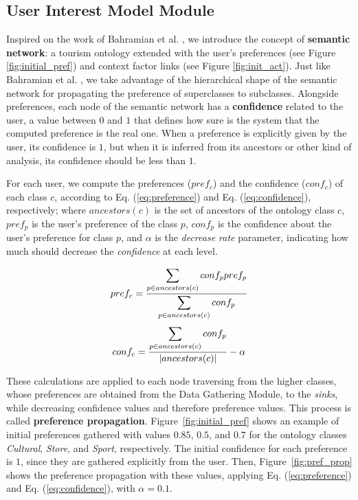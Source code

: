 \vspace{-0.2cm}
\subsection{User Interest Model Module}
Inspired on the work of Bahramian et al. \cite{bahramian_abbaspour_claramunt_2017}, we introduce the concept of \textbf{semantic network}: a tourism ontology extended with the user's preferences (see Figure \ref{fig:initial_pref}) and context factor links
(see Figure \ref{fig:init_act}). Just like Bahramian et al. \cite{bahramian_abbaspour_claramunt_2017}, we take advantage of the hierarchical shape of the semantic network for propagating the preference of superclasses to subclasses. Alongside preferences, each node of the semantic network has a \textbf{confidence} related to the user, a value between $0$ and $1$ that defines how sure is the system that the computed preference is the real one.
When a preference is explicitly given by the user, its confidence is $1$, but when it is inferred from its ancestors or other kind of analysis, its confidence should be less than $1$. 

For each user, we compute the preferences 
($pref_c$) and the confidence 
($conf_c$) of each class $c$, according to Eq. (\ref{eq:preference}) and Eq. (\ref{eq:confidence}), respectively; 
where $ancestors(c)$ is the set of ancestors of the ontology class $c$, $pref_p$ is the user's preference of the class $p$, $conf_p$ is the confidence about the user's preference for
class $p$, and $\alpha$ is  the \textit{decrease rate} parameter, indicating
how much should decrease the \textit{confidence} at each level. 

\vspace{-0.2cm}
\begin{equation} \label{eq:preference}
\footnotesize{
    pref_c = \frac{\displaystyle \sum_{p \in ancestors(c)}{conf_p pref_p}}
    {\displaystyle  \sum_{p \in ancestors(c)} {conf_p}}
    }
\end{equation}
\begin{equation} \label{eq:confidence}
\footnotesize{
    conf_c = \frac{\displaystyle \sum_{p \in ancestors(c)} {conf_p}}{|ancestors(c)|} - \alpha
    }
\end{equation}

These calculations are applied to each node traversing from the higher classes, whose preferences are obtained from the Data Gathering Module, to the \textit{sinks}, while decreasing confidence values and therefore preference values. 
This process is called \textbf{preference propagation}. 
Figure~\ref{fig:initial_pref} shows an example of initial preferences gathered with values $0.85$, $0.5$, and $0.7$ for the
ontology classes \textit{Cultural}, \textit{Store}, and \textit{Sport}, respectively. The initial confidence for each preference is $1$, since they are gathered explicitly from the user. Then, Figure~\ref{fig:pref_prop} shows the preference propagation with these values, applying Eq. (\ref{eq:preference}) and Eq. (\ref{eq:confidence}), with $\alpha = 0.1$.

